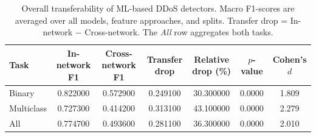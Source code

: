 \begin{table}
\caption{Overall transferability of ML-based DDoS detectors. Macro F1-scores are averaged over all models, feature approaches, and splits. Transfer drop = In-network $-$ Cross-network. The \emph{All} row aggregates both tasks.}
\label{tab:q3_overall}
\begin{tabular}{lcccccc}
\toprule
Task & In-network F1 & Cross-network F1 & Transfer drop & Relative drop (\%) & $p$-value & Cohen's $d$ \\
\midrule
Binary & 0.822000 & 0.572900 & 0.249100 & 30.300000 & 0.0000 & 1.809 \\
Multiclass & 0.727300 & 0.414200 & 0.313100 & 43.100000 & 0.0000 & 2.279 \\
All & 0.774700 & 0.493600 & 0.281100 & 36.300000 & 0.0000 & 2.010 \\
\bottomrule
\end{tabular}
\end{table}
